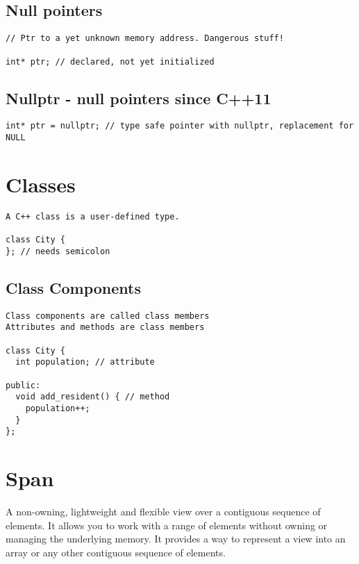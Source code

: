\subsection{Null pointers}

\begin{verbatim}
// Ptr to a yet unknown memory address. Dangerous stuff!

int* ptr; // declared, not yet initialized
\end{verbatim}

\subsection{Nullptr - null pointers since C++11}

\begin{verbatim}
int* ptr = nullptr; // type safe pointer with nullptr, replacement for NULL
\end{verbatim}

\section{Classes}

\begin{verbatim}
A C++ class is a user-defined type.

class City {
}; // needs semicolon
\end{verbatim}

\subsection{Class Components}

\begin{verbatim}
Class components are called class members
Attributes and methods are class members

class City {
  int population; // attribute
 
public:
  void add_resident() { // method
    population++;
  }
};
\end{verbatim}


\section{Span}

A non-owning, lightweight and flexible view over a contiguous sequence of elements. It allows you to work with a range of elements without owning or managing the underlying memory.
It provides a way to represent a view into an array or any other contiguous sequence of elements. 

